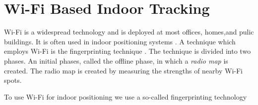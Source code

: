 
\section{Wi-Fi Based Indoor Tracking}
Wi-Fi is a widespread technology and is deployed at most offices, homes,and pulic buildings.
It is often used in indoor positioning systems \cite{mlws,5388848,832252,Bell2010,6068444}.
A technique which employs Wi-Fi is the fingerprinting technique
\cite{}. 
The technique is divided into two phases. 
An initial phases, called the offline phase, in which a \textit{radio
map} is created. 
The radio map is created by measuring the strengths of nearby Wi-Fi
spots. 

To use Wi-Fi for indoor positioning we use a so-called fingerprinting
technology \cite{6068444} 
